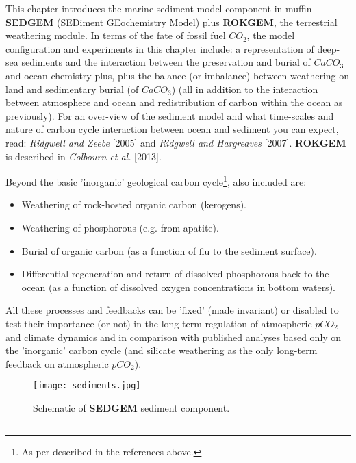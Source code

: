 This chapter introduces the marine sediment model component in muffin -- \textbf{SEDGEM} (SEDiment GEochemistry Model) plus \textbf{ROKGEM}, the terrestrial weathering module. In terms of the fate of fossil fuel \(CO_{2}\), the model configuration and experiments in this chapter include: a representation of deep-sea sediments and the interaction between the preservation and burial of \(CaCO_{3}\) and ocean chemistry plus, plus the balance (or imbalance) between weathering on land and sedimentary burial (of \(CaCO_{3}\)) (all in addition to the interaction between atmosphere and ocean and redistribution of carbon within the ocean as previously). For an over-view of the sediment model and what time-scales and nature of carbon cycle interaction between ocean and sediment you can expect, read: \textit{Ridgwell and Zeebe} [2005] and \textit{Ridgwell and Hargreaves} [2007]. \textbf{ROKGEM} is described in \textit{Colbourn et al.} [2013].

Beyond the basic 'inorganic' geological carbon cycle\footnote{As per described in the references above.}, also included are:

\begin{itemize}[noitemsep]
\setlength{\itemindent}{.2in}
\item Weathering of rock-hosted organic carbon (kerogens).
\item Weathering of phosphorous (e.g. from apatite).
\item Burial of organic carbon (as a function of flu to the sediment surface).
\item Differential regeneration and return of dissolved phosphorous back to the ocean (as a function of dissolved oxygen concentrations in bottom waters).
\end{itemize}

All these processes and feedbacks can be 'fixed' (made invariant) or disabled to test their importance (or not) in the long-term regulation of atmospheric \(pCO_{2}\) and climate dynamics and in comparison with published analyses based only on the 'inorganic' carbon cycle (and silicate weathering as the only long-term feedback on atmospheric \(pCO_{2}\)).

\begin{figure}
\texttt{[image: sediments.jpg]}
\caption{Schematic of \textbf{SEDGEM} sediment component.}
\label{fig:sediments}
\end{figure}

\vspace{1mm}
\noindent\rule{4cm}{0.1mm}
\vspace{2mm}

